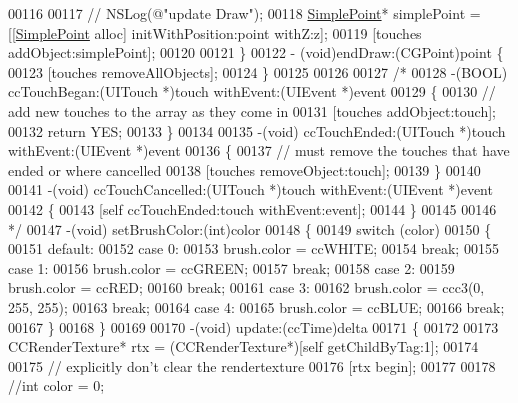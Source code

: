 \begin{DoxyCode}
00116     
00117       \textcolor{comment}{//  NSLog(@"update Draw");}
00118     \hyperlink{interface_simple_point}{SimplePoint}* simplePoint = [[\hyperlink{interface_simple_point}{SimplePoint} alloc] initWithPosition:point withZ:z];
00119     [touches addObject:simplePoint];
00120     
00121 \}
00122 - (void)endDraw:(CGPoint)point \{
00123     [touches removeAllObjects];
00124 \}
00125 
00126 
00127 \textcolor{comment}{/*}
00128 \textcolor{comment}{-(BOOL) ccTouchBegan:(UITouch *)touch withEvent:(UIEvent *)event}
00129 \textcolor{comment}{\{}
00130 \textcolor{comment}{    // add new touches to the array as they come in}
00131 \textcolor{comment}{    [touches addObject:touch];}
00132 \textcolor{comment}{    return YES;}
00133 \textcolor{comment}{\}}
00134 \textcolor{comment}{}
00135 \textcolor{comment}{-(void) ccTouchEnded:(UITouch *)touch withEvent:(UIEvent *)event}
00136 \textcolor{comment}{\{}
00137 \textcolor{comment}{    // must remove the touches that have ended or where cancelled}
00138 \textcolor{comment}{    [touches removeObject:touch];}
00139 \textcolor{comment}{\}}
00140 \textcolor{comment}{}
00141 \textcolor{comment}{-(void) ccTouchCancelled:(UITouch *)touch withEvent:(UIEvent *)event}
00142 \textcolor{comment}{\{}
00143 \textcolor{comment}{    [self ccTouchEnded:touch withEvent:event];}
00144 \textcolor{comment}{\}}
00145 \textcolor{comment}{}
00146 \textcolor{comment}{*/}
00147 -(void) setBrushColor:(\textcolor{keywordtype}{int})color
00148 \{
00149     \textcolor{keywordflow}{switch} (color)
00150     \{
00151         \textcolor{keywordflow}{default}:
00152         \textcolor{keywordflow}{case} 0:
00153             brush.color = ccWHITE;
00154             \textcolor{keywordflow}{break};
00155         \textcolor{keywordflow}{case} 1:
00156             brush.color = ccGREEN;
00157             \textcolor{keywordflow}{break};
00158         \textcolor{keywordflow}{case} 2:
00159             brush.color = ccRED;
00160             \textcolor{keywordflow}{break};
00161         \textcolor{keywordflow}{case} 3:
00162             brush.color = ccc3(0, 255, 255);
00163             \textcolor{keywordflow}{break};
00164         \textcolor{keywordflow}{case} 4:
00165             brush.color = ccBLUE;
00166             \textcolor{keywordflow}{break};
00167     \}
00168 \}
00169 
00170 -(void) update:(ccTime)delta
00171 \{
00172 
00173     CCRenderTexture* rtx = (CCRenderTexture*)[\textcolor{keyword}{self} getChildByTag:1];
00174 
00175     \textcolor{comment}{// explicitly don't clear the rendertexture}
00176     [rtx begin];
00177 
00178     \textcolor{comment}{//int color = 0;}

\end{DoxyCode}
